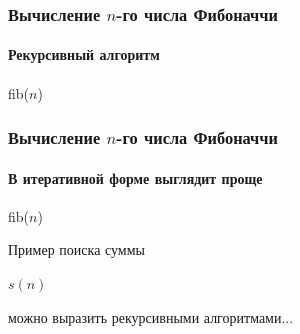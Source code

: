 \begin{frame}
    \frametitle{Вычисление $n$-го числа Фибоначчи}
    \framesubtitle{Рекурсивный алгоритм}
    
    \begin{algorithm}[H]
        \caption{fib($n$)}
        \begin{algorithmic}[1]
            
            \ENDIF
            \ENDIF
        \end{algorithmic}
    \end{algorithm}
\end{frame}

\begin{frame}
    \frametitle{Вычисление $n$-го числа Фибоначчи}
    \framesubtitle{В итеративной форме выглядит проще}
    
    \begin{algorithm}[H]
        \caption{fib($n$)}
        \begin{algorithmic}[1]
            
            \ENDWHILE
        \end{algorithmic}
    \end{algorithm}
\end{frame}

\begin{frame}
    \begin{center}Пример поиска суммы\end{center}
    
    \begin{algorithm}[H]
        \caption{$s(n)$}
        \begin{algorithmic}[1]
            \ENDWHILE
        \end{algorithmic}
    \end{algorithm}
    \begin{center}можно выразить рекурсивными алгоритмами...\end{center}
\end{frame}
    
